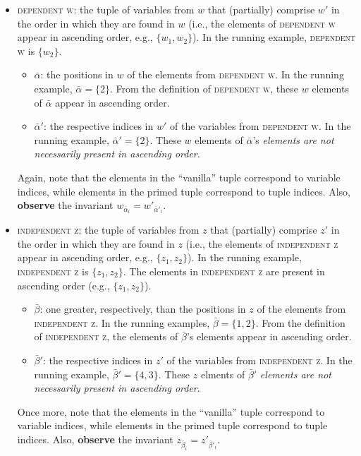 \documentclass{article}
\newcommand{\1}{(\textos{1})\!}
\newcommand{\2}{(\textos{2})\!}
\newcommand{\3}{(\textos{3})\!}
\newcommand{\4}{(\textos{4})\!}
\newcommand{\5}{(\textos{5})\!}
\newcommand{\6}{(\textos{6})\!}
\newcommand{\7}{(\textos{7})\!}
\newcommand{\8}{(\textos{8})\!}
\begin{document}
\begin{itemize}
	\item \textsc{dependent w}: the tuple of variables from $w$ that (partially) comprise $w'$ in the order in which they are found in $w$ (i.e., the elements of \textsc{dependent w} appear in ascending order, e.g., $\{ w_1, w_2 \}$). In the running example, \textsc{dependent w} is $\{ w_2 \}$.
		\begin{itemize}
			\item $\bar{\alpha}$: the positions in $w$ of the elements from \textsc{dependent w}. In the running example, $\bar{\alpha} = \{ 2 \}$. From the definition of \textsc{dependent w}, these $w$ elements of $\bar{\alpha}$ appear in ascending order.
			\item $\bar{\alpha}'$: the respective indices in $w'$ of the variables from \textsc{dependent w}. In the running example, $\bar{\alpha}' = \{ 2 \}$. These $w$ elements of $\bar{\alpha}$'s \emph{elements are not necessarily present in ascending order}.
		\end{itemize}
		Again, note that the elements in the ``vanilla'' tuple correspond to variable indices, while elements in the primed tuple correspond to tuple indices. Also, \textbf{observe} the invariant $w_{\bar{\alpha}_i} = w'_{\bar{\alpha}'_i}$.
	\item \textsc{independent z}: the tuple of variables from $z$ that (partially) comprise $z'$ in the order in which they are found in $z$ (i.e., the elements of \textsc{independent z} appear in ascending order, e.g., $\{ z_1, z_2 \}$). In the running example, \textsc{independent z} is $\{ z_1, z_2 \}$. The elements in \textsc{independent z} are present in ascending order (e.g., $\{ z_1, z_2 \}$).
		\begin{itemize}
			\item $\bar{\beta}$: one greater, respectively, than the positions in $z$ of the elements from \textsc{independent z}. In the running examples, $\bar{\beta} = \{1, 2 \}$. From the definition of \textsc{independent z}, the elements of $\bar{\beta}$'s elements appear in ascending order.
			\item $\bar{\beta}'$: the respective indices in $z'$ of the variables from \textsc{independent z}. In the running example, $\bar{\beta}' = \{4, 3 \}$. These $z$ elments of $\bar{\beta}'$ \emph{elements are not necessarily present in ascending order}.
		\end{itemize}
		Once more, note that the elements in the ``vanilla'' tuple correspond to variable indices, while elements in the primed tuple correspond to tuple indices. Also, \textbf{observe} the invariant $z_{\bar{\beta}_i} = z'_{\bar{\beta}'_i}$.
\end{itemize}
\end{document}
